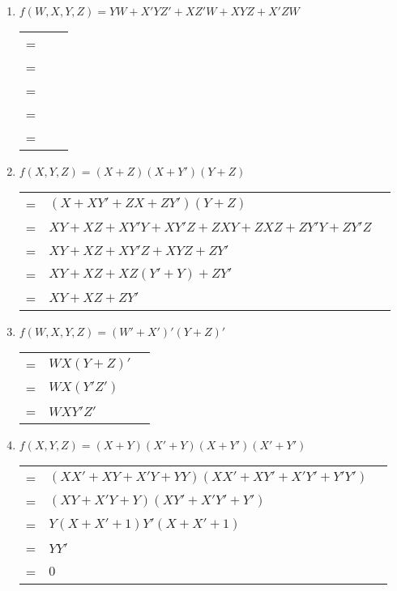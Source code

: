 \documentclass[12pt]{article}
\begin{document}
\begin{enumerate}
    \pagebreak
    
    \item $f(W, X, Y, Z) = YW + X'YZ' + XZ'W + XYZ + X'ZW$ \\
    \begin{tabular}{r l l}
        = & $ $ & \\
        = & $ $ & \\
        = & $ $ & \\
        = & $ $ & \\
        = & $ $ & \\
    \end{tabular}
    
    \pagebreak
    
    \item $f(X, Y, Z) = (X + Z)(X + Y')(Y + Z)$ \\
    \begin{tabular}{r l l}
        = & $(X + XY' + ZX + ZY')(Y + Z)$ & \\
        = & $XY + XZ + XY'Y + XY'Z + ZXY + ZXZ + ZY'Y + ZY'Z$ & \\
        = & $XY + XZ + XY'Z + XYZ + ZY'$ & \\
        = & $XY + XZ + XZ(Y' + Y) + ZY'$ & \\
        = & $XY + XZ + ZY'$ & \\
    \end{tabular}
    
    \vspace{20mm}
    
    \item $f(W, X, Y, Z) = (W' + X')' (Y + Z)'$\\
    \begin{tabular}{r l l}
        = & $WX(Y+Z)'$ & \\
        = & $WX(Y'Z')$ & \\
        = & $WXY'Z'$ & \\
    \end{tabular}
    
    \pagebreak
    
    \item $f(X, Y, Z) = (X + Y)(X' + Y)(X + Y')(X' + Y')$ \\
    \begin{tabular}{r l l}
        = & $(XX' + XY + X'Y + YY)(XX' + XY' + X'Y' + Y'Y')$ & \\
        = & $(XY + X'Y + Y)(XY' + X'Y' + Y')$ & \\
        = & $Y(X + X' + 1)Y'(X + X' + 1)$ & \\
        = & $YY'$ & \\
        = & $0$ & \\
    \end{tabular}
    

\end{enumerate}
\end{document}
